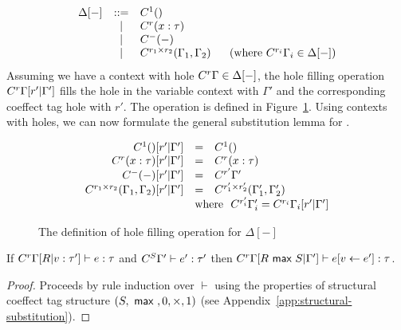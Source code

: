 \begin{equation*}
\begin{array}{rcl}
\Delta[-] &::=& C^{1}() \\
       & \;\; | \;\; & C^{r}(x:\tau)\\
       & \;\; | \;\; & C^{-}(-) \\
       & \;\; | \;\; & C^{r_1 \times r_2}(\Gamma_1, \Gamma_2)\quad~~(\textnormal{where}~C^{r_i}\Gamma_i \in \Delta[-])\\
\end{array}
\end{equation*}
%
Assuming we have a context with hole $C^{r}\Gamma \in \Delta[-]$, the hole filling 
operation $C^{r}\Gamma[r'|\Gamma']$ fills the hole in the variable context with 
$\Gamma'$ and the corresponding coeffect tag hole with $r'$. The operation is defined in 
Figure~\ref{fig:structural-hole-fill}. Using contexts with holes, we can now formulate the
general substitution lemma for \clstr.

\begin{figure}

\begin{equation*}
\begin{array}{rcl}
                              \chole{1}{()}{r'}{\Gamma'} &=& \ctyp{1}{()}\\
                        \chole{r}{(x:\tau)}{r'}{\Gamma'} &=& \ctyp{r}{(x:\tau)}\\
                             \chole{-}{(-)}{r'}{\Gamma'} &=& \ctyp{r'}{\Gamma'}\\
\chole{r_1 \cprd r_2}{(\Gamma_1, \Gamma_2)}{r'}{\Gamma'} &=& \ctyp{r_1' \cprd r_2'}{(\Gamma_1', \Gamma_2')}\\
&\multicolumn{2}{l} {
  \textnormal{where}~~\ctyp{r_i'}{\Gamma_i'} = \chole{r_i}{\Gamma_i}{r'}{\Gamma'}
}
\end{array}
\end{equation*}
\caption{The definition of hole filling operation for $\Delta[-]$}
\label{fig:structural-hole-fill}
\vspace{-2em}
\end{figure}

\begin{lemma}
\label{thm:structural-subst}
If $C^{r}\Gamma[R|v:\tau'] \vdash e : \tau$ and $C^{S}\Gamma' \vdash e' : \tau'$
then $C^{r}\Gamma[R ~\textnormal{\sffamily max}~ S|\Gamma'] \vdash e[v \leftarrow e'] : \tau$.
\end{lemma} 
\begin{proof}
Proceeds by rule induction over $\vdash$ using the properties of structural coeffect tag structure
$(S, ~\textnormal{\sffamily max}~, 0, \times, 1)$ (see Appendix~\ref{app:structural-substitution}).
\end{proof}

